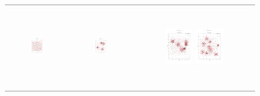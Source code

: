 \begin{figure}[p]
\begin{tabular}{ccc}
        \includegraphics[height=36mm,width=0.24\textwidth]{Images/data/21.png}
        & \includegraphics[height=36mm,width=0.24\textwidth]{Images/data/22.png}
        & \includegraphics[height=36mm,width=0.24\textwidth]{Images/data/23.png}
         \includegraphics[height=36mm,width=0.24\textwidth]{Images/data/24.png}\\[-4pt]


\end{tabular}
\end{figure}
